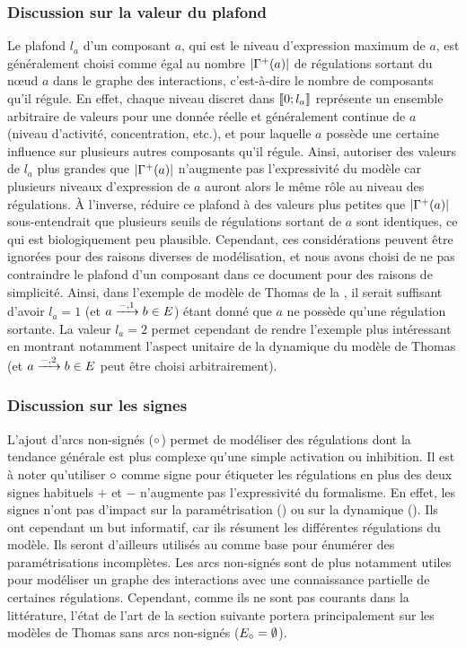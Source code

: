 \subsubsection*{Discussion sur la valeur du plafond}
Le plafond $l_a$ d'un composant $a$, qui est le niveau d'expression maximum de $a$,
est généralement choisi comme égal au nombre $|\Gamma^+(a)|$
de régulations sortant du nœud $a$ dans le graphe des interactions,
c'est-à-dire le nombre de composants qu'il régule.
En effet, chaque niveau discret dans $\mathopen{\llbracket}0\mathclose{};l_a\mathclose{\rrbracket}$ représente un ensemble arbitraire de valeurs
pour une donnée réelle et généralement continue de $a$ (niveau d'activité, concentration, etc.),
et pour laquelle $a$ possède une certaine influence sur plusieurs autres composants qu'il régule.
Ainsi, autoriser des valeurs de $l_a$ plus grandes que $|\Gamma^+(a)|$
n'augmente pas l'expressivité du modèle
car plusieurs niveaux d'expression de $a$ auront alors le même rôle au niveau des régulations.
À l'inverse, réduire ce plafond à des valeurs plus petites que $|\Gamma^+(a)|$
sous-entendrait que plusieurs seuils de régulations sortant de $a$ sont identiques,
ce qui est biologiquement peu plausible.
Cependant, ces considérations peuvent être ignorées pour des raisons diverses de modélisation,
et nous avons choisi de ne pas contraindre le plafond d'un composant dans ce document
pour des raisons de simplicité.
Ainsi, dans l'exemple de modèle de Thomas de la ,
il serait suffisant d'avoir $l_a = 1$ (et $a \xrightarrow{-, 1} b \in E$)
étant donné que $a$ ne possède qu'une régulation sortante.
La valeur $l_a = 2$ permet cependant de rendre l'exemple plus intéressant
en montrant notamment l'aspect unitaire de la dynamique du modèle de Thomas
(et $a \xrightarrow{-, 2} b \in E$ peut être choisi arbitrairement).

\subsubsection*{Discussion sur les signes}
L'ajout d'arcs non-signés ($\circ$) permet de modéliser des régulations dont la tendance générale
est plus complexe qu'une simple activation ou inhibition.
Il est à noter qu'utiliser $\circ$ comme signe pour étiqueter les régulations en plus
des deux signes habituels $+$ et $-$ n'augmente pas l'expressivité du formalisme.
En effet, les signes n'ont pas d'impact sur la paramétrisation ()
ou sur la dynamique ().
Ils ont cependant un but informatif, car ils résument les différentes régulations du modèle.
Ils seront d'ailleurs utilisés au 
comme base pour énumérer des paramétrisations incomplètes.
Les arcs non-signés sont de plus notamment utiles pour modéliser un graphe des interactions
avec une connaissance partielle de certaines régulations.
Cependant, comme ils ne sont pas courants dans la littérature,
l'état de l'art de la section suivante portera principalement
sur les modèles de Thomas sans arcs non-signés ($E_\circ = \emptyset$).

